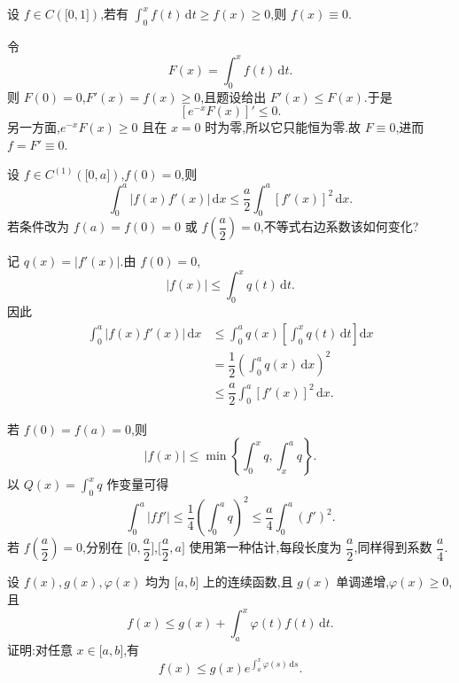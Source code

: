 \begin{example}
    设 $f\in C(\lbrack 0,1\rbrack)$,若有 $\displaystyle\int_0^x f(t)\,\mathrm{d}t\geq f(x)\geq0$,则 $f(x)\equiv0$.
\end{example}
\exampleblank

\begin{solution}
    令
    \[
        F(x)=\int_0^xf(t)\,\mathrm{d}t.
    \]
    则 $F(0)=0$,$F'(x)=f(x)\geq0$,且题设给出 $F'(x)\leq F(x)$.于是
    \[
        [e^{-x}F(x)]'\leq0.
    \]
    另一方面,$e^{-x}F(x)\geq0$ 且在 $x=0$ 时为零,所以它只能恒为零.故 $F\equiv0$,进而 $f=F'\equiv0$.
\end{solution}

\begin{example}
    设 $f\in C^{(1)}(\lbrack 0,a\rbrack)$,$f(0)=0$,则
    \[
        \displaystyle\int_0^a|f(x)f'(x)|\,\mathrm{d}x
        \leq\dfrac{a}{2}\int_0^a[f'(x)]^2\,\mathrm{d}x.
    \]
    若条件改为 $f(a)=f(0)=0$ 或 $f\left(\dfrac{a}{2}\right)=0$,不等式右边系数该如何变化?
\end{example}
\exampleblank

\begin{solution}
    记 $q(x)=|f'(x)|$.由 $f(0)=0$,
    \[
        |f(x)|\leq\int_0^xq(t)\,\mathrm{d}t.
    \]
    因此
    \[
        \begin{aligned}
            \int_0^a|f(x)f'(x)|\,\mathrm{d}x
             & \leq\int_0^aq(x)\left[\int_0^xq(t)\,\mathrm{d}t\right]\mathrm{d}x \\
             & =\dfrac{1}{2}\left(\int_0^aq(x)\,\mathrm{d}x\right)^2             \\
             & \leq\dfrac{a}{2}\int_0^a[f'(x)]^2\,\mathrm{d}x.
        \end{aligned}
    \]

    若 $f(0)=f(a)=0$,则
    \[
        |f(x)|\leq\min\left\{\int_0^xq,\int_x^aq\right\}.
    \]
    以 $Q(x)=\displaystyle\int_0^xq$ 作变量可得
    \[
        \displaystyle\int_0^a|ff'|
        \leq\dfrac{1}{4}\left(\int_0^aq\right)^2
        \leq\dfrac{a}{4}\int_0^a(f')^2.
    \]
    若 $f\left(\dfrac{a}{2}\right)=0$,分别在 $\lbrack0,\dfrac{a}{2}\rbrack$,$\lbrack \dfrac{a}{2},a\rbrack$ 使用第一种估计,每段长度为 $\dfrac{a}{2}$,同样得到系数 $\boxed{\dfrac{a}{4}}$.
\end{solution}

\begin{example}[Gronwall 引理]
    设 $f(x),g(x),\varphi(x)$ 均为 $\lbrack a,b\rbrack$ 上的连续函数,且 $g(x)$ 单调递增,$\varphi(x)\geq0$,且
    \[
        f(x)\leq g(x)+\int_a^x\varphi(t)f(t)\,\mathrm{d}t.
    \]
    证明:对任意 $x\in\lbrack a,b\rbrack$,有
    \[
        f(x)\leq g(x)e^{\int_a^x\varphi(s)\,\mathrm{d}s}.
    \]
\end{example}
\exampleblank


